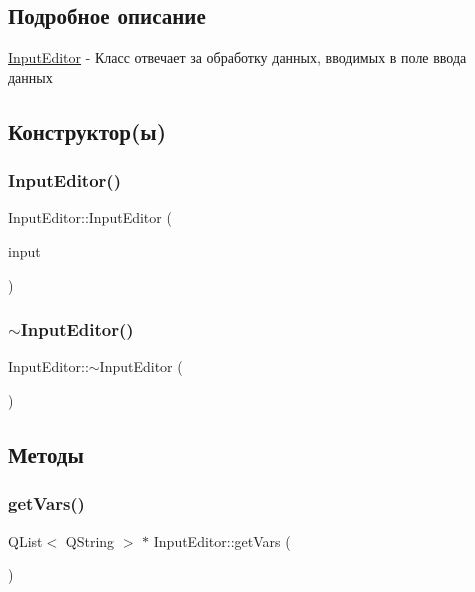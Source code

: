 \subsection{Подробное описание}
\hyperlink{class_input_editor}{Input\+Editor} -\/ Класс отвечает за обработку данных, вводимых в поле ввода данных 

\subsection{Конструктор(ы)}
\mbox{\label{class_input_editor_ac9aae2a915a58eae586aa373c1b1f635}} 
\subsubsection{\texorpdfstring{Input\+Editor()}{InputEditor()}}
{\footnotesize\ttfamily Input\+Editor\+::\+Input\+Editor (\begin{DoxyParamCaption}\item[{Q\+Line\+Edit $\ast$}]{input }\end{DoxyParamCaption})}

\mbox{\label{class_input_editor_aec1a586153ea14380867eff2c7605bec}} 
\subsubsection{\texorpdfstring{$\sim$\+Input\+Editor()}{~InputEditor()}}
{\footnotesize\ttfamily Input\+Editor\+::$\sim$\+Input\+Editor (\begin{DoxyParamCaption}{ }\end{DoxyParamCaption})}



\subsection{Методы}
\mbox{\label{class_input_editor_a3f69e5b7fe43e31f2a4f783fbdc8072e}} 
\subsubsection{\texorpdfstring{get\+Vars()}{getVars()}}
{\footnotesize\ttfamily Q\+List$<$ Q\+String $>$ $\ast$ Input\+Editor\+::get\+Vars (\begin{DoxyParamCaption}{ }\end{DoxyParamCaption})}



